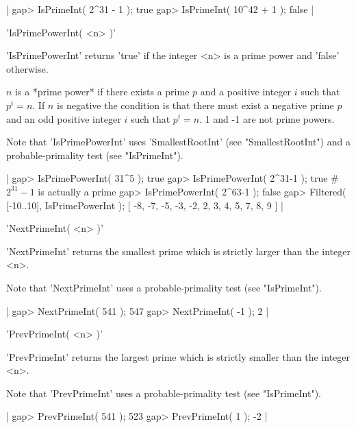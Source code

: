 |    gap> IsPrimeInt( 2^31 - 1 );
    true
    gap> IsPrimeInt( 10^42 + 1 );
    false |

%

'IsPrimePowerInt( <n> )'

'IsPrimePowerInt' returns 'true' if the integer <n>  is a prime power and
'false' otherwise.

$n$ is a *prime power* if there exists a prime $p$ and a positive integer
$i$ such that $p^i = n$.  If $n$ is negative the  condition is that there
must exist a negative prime $p$ and an odd positive integer $i$ such that
$p^i = n$.  1 and -1 are not prime powers.

Note    that 'IsPrimePowerInt'      uses       'SmallestRootInt'     (see
"SmallestRootInt") and a probable-primality test (see "IsPrimeInt").

|    gap> IsPrimePowerInt( 31^5 );
    true
    gap> IsPrimePowerInt( 2^31-1 );
    true        # $2^{31}-1$ is actually a prime
    gap> IsPrimePowerInt( 2^63-1 );
    false
    gap> Filtered( [-10..10], IsPrimePowerInt );
    [ -8, -7, -5, -3, -2, 2, 3, 4, 5, 7, 8, 9 ] |

%

'NextPrimeInt( <n> )'

'NextPrimeInt' returns the smallest  prime which  is strictly larger than
the integer <n>.

Note  that     'NextPrimeInt'  uses  a    probable-primality  test   (see
"IsPrimeInt").

|    gap> NextPrimeInt( 541 );
    547
    gap> NextPrimeInt( -1 );
    2 |

%

'PrevPrimeInt( <n> )'

'PrevPrimeInt' returns the largest prime  which is  strictly smaller than
the integer <n>.

Note  that    'PrevPrimeInt'   uses   a  probable-primality    test  (see
"IsPrimeInt").

|    gap> PrevPrimeInt( 541 );
    523
    gap> PrevPrimeInt( 1 );
    -2 |

%

